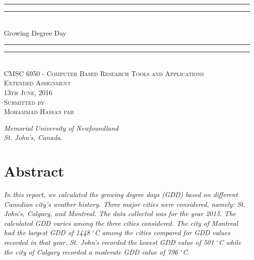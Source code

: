 \documentclass{article}
\begin{document}
{\centering

\rule{\textwidth}{1.6pt}\vspace*{-\baselineskip}\vspace*{2pt} 
\rule{\textwidth}{0.4pt}\\[\baselineskip] 
{\LARGE Growing Degree Day}
\rule{\textwidth}{0.4pt}\vspace*{-\baselineskip}\vspace{3.2pt}
\rule{\textwidth}{1.6pt}\\[\baselineskip] 

\vspace{20mm} %
\scshape %
CMSC 6950 - Computer Based Research Tools and Applications \\ [\baselineskip]
Extended Assignment \\[\baselineskip] 
13th June, 2016 \\[\baselineskip] 
\vspace{20mm} %
Submitted by \\[\baselineskip]
{\Large Mohammad Hassan par}
\vfill
{\itshape Memorial University of Newfoundland \\ St. John's, Canada.\par} 
}

\newpage

{\centering
  \section*{Abstract}
}

{\itshape In this report, we calculated the growing degree days (GDD) based on different Canadian city's weather history. Three major cities were considered, namely: St. John’s, Calgary, and Montreal. The data collected was for the year 2015. The calculated GDD varies among the three cities considered. The city of Montreal had the largest GDD of 1448 $^{\circ}$C among the cities compared for GDD values recorded in that year. St. John's recorded the lowest GDD value of 501 $^{\circ}$C while the city of Calgary recorded a moderate GDD value of 796 $^{\circ}$C.\\
}

\end{document}

